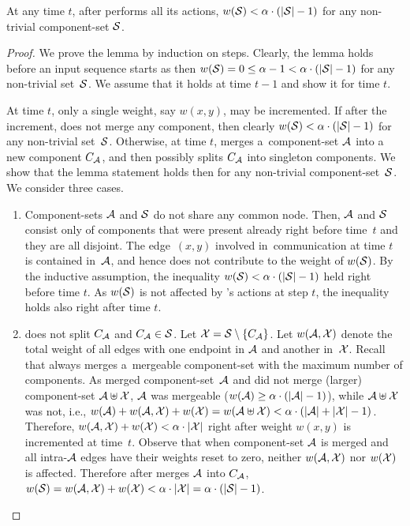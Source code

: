 \begin{lemma}
\label{lem:wS_bound}
At any time $t$, after \CREP performs all its actions,
$w(\mathcal{S}) < \alpha \cdot (|\mathcal{S}|-1)$ for any non-trivial component-set $\mathcal{S}$.
\end{lemma}

\begin{proof}
We prove the lemma by induction on steps. Clearly, the lemma holds before an
input sequence starts as then $w(\mathcal{S}) = 0 \leq \alpha - 1 < \alpha \cdot
(|\mathcal{S}|-1)$ for any non-trivial set~$\mathcal{S}$. We assume that it holds at time $t-1$
and show it for time $t$.

At time $t$, only a single weight, say $w(x,y)$, may be incremented. If after
the increment, \CREP does not merge any component, then clearly $w(\mathcal{S}) < \alpha
\cdot (|\mathcal{S}|-1)$ for any non-trivial set~$\mathcal{S}$. Otherwise, at time $t$, \CREP
merges a~component-set $\mathcal{A}$ into a new component $C_{\mathcal{A}}$, and then possibly
splits $C_{\mathcal{A}}$ into singleton components. We show that
the lemma statement holds then for any non-trivial component-set~$\mathcal{S}$. We
consider three cases.

\begin{enumerate}

\item Component-sets $\mathcal{A}$ and $\mathcal{S}$ do not share any common node. Then, $\mathcal{A}$ and
$\mathcal{S}$ consist only of components that were present already right before time~$t$
and they are all disjoint. The edge~$(x,y)$ involved in~communication at time
$t$ is contained in~$\mathcal{A}$, and hence does not contribute to the weight of
$w(\mathcal{S})$. By the inductive assumption, the inequality 
$w(\mathcal{S}) < \alpha \cdot (|\mathcal{S}|-1)$ held right
before time $t$. As $w(\mathcal{S})$ is not affected by \CREP's actions at step $t$, the
inequality holds also right after time $t$.

\item \CREP does not split $C_{\mathcal{A}}$ and $C_{\mathcal{A}} \in \mathcal{S}$. Let $\mathcal{X} = \mathcal{S} \setminus
\{C_{\mathcal{A}}\}$. Let $w(\mathcal{A},\mathcal{X})$ denote the total weight of all edges with one endpoint
in $\mathcal{A}$ and another in~$\mathcal{X}$. Recall that
\CREP always merges a~mergeable component-set with the maximum number of components. 
As \CREP merged component-set~$\mathcal{A}$ and did not merge
(larger) component-set $\mathcal{A} \uplus \mathcal{X}$, $\mathcal{A}$ was mergeable ($w(\mathcal{A}) \geq \alpha \cdot
(|\mathcal{A}|-1)$), while $\mathcal{A} \uplus \mathcal{X}$ was not, i.e., $w(\mathcal{A}) + w(\mathcal{A},\mathcal{X}) + w(\mathcal{X}) = w(\mathcal{A}
\uplus \mathcal{X}) < \alpha \cdot (|\mathcal{A}|+|\mathcal{X}|-1)$. Therefore, $w(\mathcal{A},\mathcal{X}) + w(\mathcal{X}) < \alpha
\cdot |\mathcal{X}|$ right after weight $w(x,y)$ is incremented at time~$t$. Observe
that when component-set $\mathcal{A}$ is merged and all intra-$\mathcal{A}$ edges have their weights 
reset to zero, neither $w(\mathcal{A},\mathcal{X})$ nor $w(\mathcal{X})$ is affected.
Therefore after \CREP merges $\mathcal{A}$ into $C_{\mathcal{A}}$, $w(\mathcal{S}) =
w(\mathcal{A},\mathcal{X}) + w(\mathcal{X}) < \alpha \cdot |\mathcal{X}| = \alpha \cdot (|\mathcal{S}| - 1)$.


\end{enumerate}
\end{proof}
